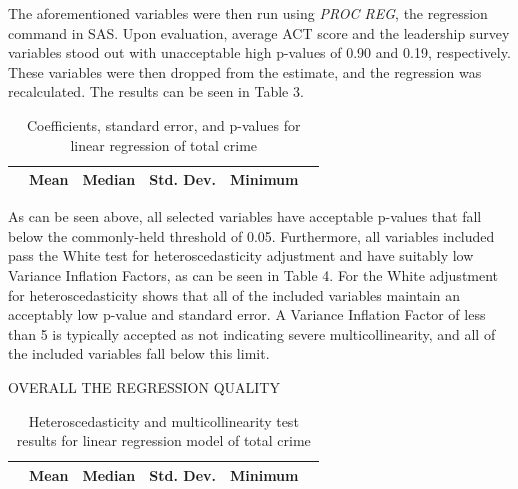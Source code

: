 \documentclass[12pt]{article}
\begin{document}
\par

The aforementioned variables were then run using \textit{PROC REG}, the regression command in SAS.  Upon evaluation, average ACT score and the leadership survey variables stood out with unacceptable high p-values of 0.90 and 0.19, respectively.  These variables were then dropped from the estimate, and the regression was recalculated.  The results can be seen in Table 3.



\begin{center}
	\begin{table}[h]
		\begin{tabular}{ c | c | c | c | c | c }
			
			& \textbf{Mean} & \textbf{Median} & \textbf{Std. Dev.} & \textbf{Minimum} & \\
			\hline
			
			
		\end{tabular}
		\caption{Coefficients, standard error, and p-values for linear regression of total crime}
	\end{table}
\end{center}

As can be seen above, all selected variables have acceptable p-values that fall below the commonly-held threshold of 0.05.  Furthermore, all variables included pass the White test for heteroscedasticity adjustment and have suitably low Variance Inflation Factors, as can be seen in Table 4.  For the White adjustment for heteroscedasticity shows that all of the included variables maintain an acceptably low p-value and standard error.  A Variance Inflation Factor of less than 5 is typically accepted as not indicating severe multicollinearity, and all of the included variables fall below this limit.

\par

OVERALL THE REGRESSION QUALITY

\begin{center}
	\begin{table}[h]
		\begin{tabular}{ c | c | c | c | c | c }
			
			& \textbf{Mean} & \textbf{Median} & \textbf{Std. Dev.} & \textbf{Minimum} & \\
			\hline
			
			
		\end{tabular}
		\caption{Heteroscedasticity and multicollinearity test results for linear regression model of total crime}
	\end{table}
\end{center}
\end{document}
